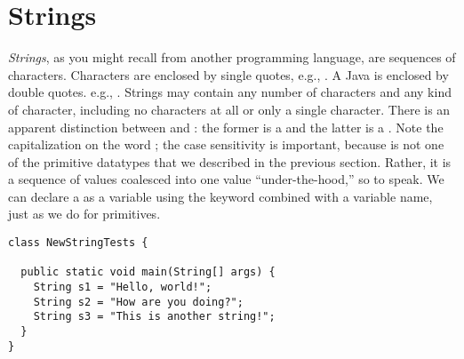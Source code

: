 \section{Strings}

\emph{Strings}, as you might recall from another programming language, are sequences of characters. 
Characters are enclosed by single quotes, e.g., . 
A Java  is enclosed by double quotes. e.g., . 
Strings may contain any number of characters and any kind of character, including no characters at all or only a single character. 
There is an apparent distinction between  and : the former is a  and the latter is a . 
Note the capitalization on the word ; the case sensitivity is important, because  is not one of the primitive datatypes that we described in the previous section. 
Rather, it is a sequence of  values coalesced into one value ``under-the-hood,'' so to speak. 
We can declare a  as a variable using the keyword combined with a variable name, just as we do for primitives. 

\begin{lstlisting}[language=MyJava]
class NewStringTests {

  public static void main(String[] args) {
    String s1 = "Hello, world!";
    String s2 = "How are you doing?";
    String s3 = "This is another string!";
  }
}
\end{lstlisting}

